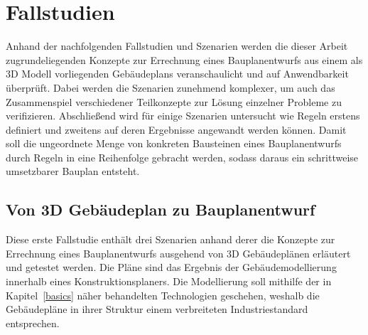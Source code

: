 \chapter{Fallstudien}\label{scenarios}
Anhand der nachfolgenden Fallstudien und Szenarien werden die dieser Arbeit zugrundeliegenden Konzepte zur Errechnung eines Bauplanentwurfs aus einem als 3D Modell vorliegenden Gebäudeplans veranschaulicht und auf Anwendbarkeit überprüft.
Dabei werden die Szenarien zunehmend komplexer, um auch das Zusammenspiel verschiedener Teilkonzepte zur Lösung einzelner Probleme zu verifizieren.
Abschließend wird für einige Szenarien untersucht wie Regeln erstens definiert und zweitens auf deren Ergebnisse angewandt werden können.
Damit soll die ungeordnete Menge von konkreten Bausteinen eines Bauplanentwurfs durch Regeln in eine Reihenfolge gebracht werden, sodass daraus ein schrittweise umsetzbarer Bauplan entsteht.

\section{Von 3D Gebäudeplan zu Bauplanentwurf}
Diese erste Fallstudie enthält drei Szenarien anhand derer die Konzepte zur Errechnung eines Bauplanentwurfs ausgehend von 3D Gebäudeplänen erläutert und getestet werden.
Die Pläne sind das Ergebnis der Gebäudemodellierung innerhalb eines Konstruktionsplaners.
Die Modellierung soll mithilfe der in Kapitel~\ref{basics} näher behandelten Technologien geschehen, weshalb die Gebäudepläne in ihrer Struktur einem verbreiteten Industriestandard entsprechen.


